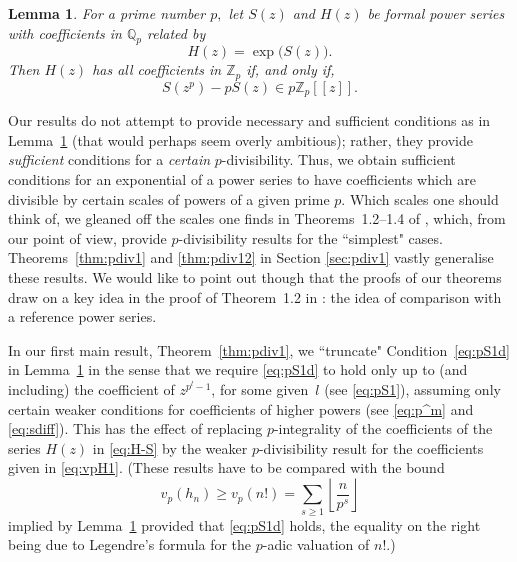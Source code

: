 \documentclass[12pt,reqno]{amsart}
\numberwithin{equation}{section}
\newtheorem{lemma}[theorem]{Lemma}
\theoremstyle{remark}
\begin{document}
\begin{lemma} \label{lem:dwork}
For a prime number $p,$
let\/ $S(z)$ and $H(z)$ be formal power series with coefficients in
${\mathbb{Q}}_p$ related by
\begin{equation} \label{eq:H-S}
H(z)=\exp\big(S(z)\big). 
\end{equation}
Then $H(z)$ has all coefficients in ${\mathbb{Z}}_p$ if, and only if,
\begin{equation} \label{eq:pS1d}
S(z^{p})-pS(z)\in p{\mathbb{Z}}_p[[z]]. 
\end{equation}
\end{lemma}
\noindent Our results do not attempt to provide necessary and
sufficient conditions  
as in Lemma~\ref{lem:dwork} (that would perhaps seem overly ambitious);
rather, they provide {\it sufficient\/} conditions 
for a {\it certain} $p$-divisibility. Thus, we obtain sufficient
conditions for an exponential of a power series to have coefficients 
which are divisible by certain scales of powers of a given prime
$p$. Which scales one should think of, we gleaned off the scales one
finds in Theorems~1.2--1.4 of \cite{KaTYAA}, which, from our point of
view, provide $p$-divisibility results for the ``simplest"
cases. Theorems~\ref{thm:pdiv1} and \ref{thm:pdiv12} in Section
\ref{sec:pdiv1} vastly generalise these results. We would like to
point out though that the proofs of our theorems draw on a key idea in
the proof of Theorem~1.2 in \cite{KaTYAA}: the idea of comparison with
a reference power series. 

In our first main result, Theorem~\ref{thm:pdiv1},
we ``truncate" Condition~\eqref{eq:pS1d} in
Lemma~\ref{lem:dwork} in the sense that  
we require \eqref{eq:pS1d} to hold only up to (and including) the
coefficient of $z^{p^l-1}$, for some given~$l$ (see \eqref{eq:pS1}),
assuming only certain weaker conditions for coefficients of higher
powers  
(see \eqref{eq:p^m} and \eqref{eq:sdiff}). This has the effect of
replacing $p$-integrality of the coefficients of the series $H(z)$ in
\eqref{eq:H-S} by the weaker $p$-divisibility result for the
coefficients given in \eqref{eq:vpH1}. (These results have to be
compared with the bound
\begin{equation} \label{eq:hnn!} 
v_p(h_n)\ge v_p(n!)=\sum_{s\geq1} {\left\lfloor{\frac{n}{p^s}}\right\rfloor}
\end{equation}
implied by Lemma~\ref{lem:dwork} provided that \eqref{eq:pS1d} holds,
the equality on the right being due to 
Legendre's formula \cite[p.~10]{LegeAA} for the $p$-adic
valuation of $n!$.)
\end{document}
